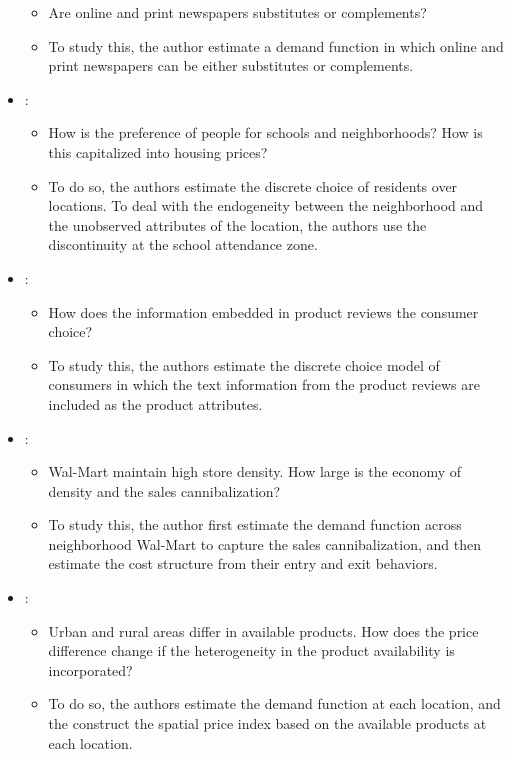 \documentclass[
]{book}
\providecommand{\tightlist}{%
  \setlength{\itemsep}{0pt}\setlength{\parskip}{0pt}}
\begin{document}
\begin{itemize}
  \begin{itemize}
  \tightlist
  \item
    Are online and print newspapers substitutes or complements?
  \item
    To study this, the author estimate a demand function in which online and print newspapers can be either substitutes or complements.
  \end{itemize}
\item
  \citet{Bayer2007}:

  \begin{itemize}
  \tightlist
  \item
    How is the preference of people for schools and neighborhoods? How is this capitalized into housing prices?
  \item
    To do so, the authors estimate the discrete choice of residents over locations. To deal with the endogeneity between the neighborhood and the unobserved attributes of the location, the authors use the discontinuity at the school attendance zone.
  \end{itemize}
\item
  \citet{Archak2011}:

  \begin{itemize}
  \tightlist
  \item
    How does the information embedded in product reviews the consumer choice?
  \item
    To study this, the authors estimate the discrete choice model of consumers in which the text information from the product reviews are included as the product attributes.
  \end{itemize}
\item
  \citet{Holmes2011}:

  \begin{itemize}
  \tightlist
  \item
    Wal-Mart maintain high store density. How large is the economy of density and the sales cannibalization?
  \item
    To study this, the author first estimate the demand function across neighborhood Wal-Mart to capture the sales cannibalization, and then estimate the cost structure from their entry and exit behaviors.
  \end{itemize}
\item
  \citet{Handbury2014}:

  \begin{itemize}
  \tightlist
  \item
    Urban and rural areas differ in available products. How does the price difference change if the heterogeneity in the product availability is incorporated?
  \item
    To do so, the authors estimate the demand function at each location, and the construct the spatial price index based on the available products at each location.
  \end{itemize}
\end{itemize}
\end{document}
